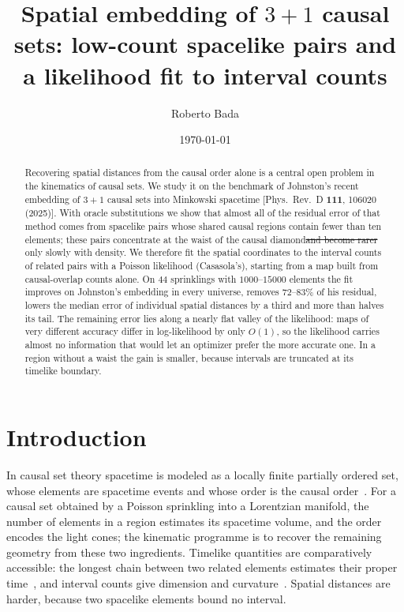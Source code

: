\documentclass[prd,twocolumn,superscriptaddress,nofootinbib,amsmath,amssymb,floatfix]{revtex4-2}
\makeatletter
\providecommand{\DIFaddtex}[1]{{\protect\color{blue}\uwave{#1}}} %
\providecommand{\DIFdeltex}[1]{{\protect\color{red}\sout{#1}}} %
\providecommand{\DIFaddbegin}{} %
\providecommand{\DIFaddend}{} %
\providecommand{\DIFdelbegin}{} %
\providecommand{\DIFdelend}{} %
\providecommand{\DIFadd}[1]{\texorpdfstring{\DIFaddtex{#1}}{#1}} %
\providecommand{\DIFdel}[1]{\texorpdfstring{\DIFdeltex{#1}}{}} %
\providecommand{\DIFscaledelfig}{0.5}
\newlength{\DIFdelgraphicswidth} %
\newlength{\DIFdelgraphicsheight} %
\providecommand{\DIFaddincludegraphics}[2][]{{\color{blue}\fbox{\DIFOincludegraphics[#1]{#2}}}} %
\providecommand{\DIFdelincludegraphics}[2][]{%
\sbox{\DIFdelgraphicsbox}{\DIFOincludegraphics[#1]{#2}}%
\settoboxwidth{\DIFdelgraphicswidth}{\DIFdelgraphicsbox} %
\settoboxtotalheight{\DIFdelgraphicsheight}{\DIFdelgraphicsbox} %
\scalebox{\DIFscaledelfig}{%
\parbox[b]{\DIFdelgraphicswidth}{\usebox{\DIFdelgraphicsbox}\\[-\baselineskip] \rule{\DIFdelgraphicswidth}{0em}}\llap{\resizebox{\DIFdelgraphicswidth}{\DIFdelgraphicsheight}{%
\setlength{\unitlength}{\DIFdelgraphicswidth}%
\begin{picture}(1,1)%
\thicklines\linethickness{2pt} %
{\color[rgb]{1,0,0}\put(0,0){\framebox(1,1){}}}%
{\color[rgb]{1,0,0}\put(0,0){\line( 1,1){1}}}%
{\color[rgb]{1,0,0}\put(0,1){\line(1,-1){1}}}%
\end{picture}%
}\hspace*{3pt}}} %
} %
\DeclareRobustCommand{\DIFaddbegin}{\DIFOaddbegin \let\includegraphics\DIFaddincludegraphics} %
\DeclareRobustCommand{\DIFaddend}{\DIFOaddend \let\includegraphics\DIFOincludegraphics} %
\DeclareRobustCommand{\DIFdelbegin}{\DIFOdelbegin \let\includegraphics\DIFdelincludegraphics} %
\DeclareRobustCommand{\DIFdelend}{\DIFOaddend \let\includegraphics\DIFOincludegraphics} %
\let\sout@orig\sout %
\renewcommand{\sout}[1]{\ifmmode\text{\sout@orig{\ensuremath{#1}}}\else\sout@orig{#1}\fi} %
\makeatother
\begin{document}
\title{Spatial embedding of $3+1$ causal sets: low-count spacelike pairs and a likelihood fit to interval counts}

\author{Roberto Bada}

\date{\today}

\begin{abstract}
Recovering spatial distances from the causal order alone is a central open problem in the kinematics of causal sets. We study it on the benchmark of Johnston's recent embedding of $3+1$ causal sets into Minkowski spacetime [Phys.\ Rev.\ D \textbf{111}, 106020 (2025)]. With oracle substitutions we show that almost all of the residual error of that method comes from spacelike pairs whose shared causal regions contain fewer than ten elements; these pairs concentrate at the waist of the causal diamond\DIFdelbegin \DIFdel{and become rarer }\DIFdelend \DIFaddbegin \DIFadd{, and their errors decrease }\DIFaddend only slowly with density. We therefore fit the spatial coordinates to the interval counts of related pairs with a Poisson likelihood (Casasola's), starting from a map built from causal-overlap counts alone. On $44$ sprinklings with $1000$--$15000$ elements the fit improves on Johnston's embedding in every universe, removes $72$--$83\%$ of his residual, lowers the median error of individual spatial distances by a third and more than halves its tail. The remaining error lies along a nearly flat valley of the likelihood: maps of very different accuracy differ in log-likelihood by only $O(1)$, so the likelihood carries almost no information that would let an optimizer prefer the more accurate one. In a region without a waist the gain is smaller, because intervals are truncated at its timelike boundary.
\end{abstract}

\maketitle

\section{Introduction}\label{sec:intro}
In causal set theory spacetime is modeled as a locally finite partially ordered set, whose elements are spacetime events and whose order is the causal order~\cite{BLMS87,Surya19}. For a causal set obtained by a Poisson sprinkling into a Lorentzian manifold, the number of elements in a region estimates its spacetime volume, and the order encodes the light cones; the kinematic programme is to recover the remaining geometry from these two ingredients. Timelike quantities are comparatively accessible: the longest chain between two related elements estimates their proper time~\cite{BrightwellGregory91}, and interval counts give dimension and curvature~\cite{GlaserSurya13,RSS13,BD10}. Spatial distances are harder, because two spacelike elements bound no interval.
\end{document}
